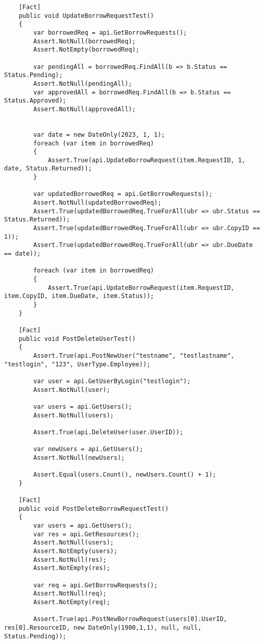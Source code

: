 \begin{verbatim}
    [Fact]
    public void UpdateBorrowRequestTest()
    {
        var borrowedReq = api.GetBorrowRequests();
        Assert.NotNull(borrowedReq);
        Assert.NotEmpty(borrowedReq);

        var pendingAll = borrowedReq.FindAll(b => b.Status == Status.Pending);
        Assert.NotNull(pendingAll);
        var approvedAll = borrowedReq.FindAll(b => b.Status == Status.Approved);
        Assert.NotNull(approvedAll);


        var date = new DateOnly(2023, 1, 1);
        foreach (var item in borrowedReq)
        {
            Assert.True(api.UpdateBorrowRequest(item.RequestID, 1, date, Status.Returned));
        }

        var updatedBorrowedReq = api.GetBorrowRequests();
        Assert.NotNull(updatedBorrowedReq);
        Assert.True(updatedBorrowedReq.TrueForAll(ubr => ubr.Status == Status.Returned));
        Assert.True(updatedBorrowedReq.TrueForAll(ubr => ubr.CopyID == 1));
        Assert.True(updatedBorrowedReq.TrueForAll(ubr => ubr.DueDate == date));

        foreach (var item in borrowedReq)
        {
            Assert.True(api.UpdateBorrowRequest(item.RequestID, item.CopyID, item.DueDate, item.Status));
        }
    }

    [Fact]
    public void PostDeleteUserTest()
    {
        Assert.True(api.PostNewUser("testname", "testlastname", "testlogin", "123", UserType.Employee));

        var user = api.GetUserByLogin("testlogin");
        Assert.NotNull(user);

        var users = api.GetUsers();
        Assert.NotNull(users);

        Assert.True(api.DeleteUser(user.UserID));

        var newUsers = api.GetUsers();
        Assert.NotNull(newUsers);

        Assert.Equal(users.Count(), newUsers.Count() + 1);
    }

    [Fact]
    public void PostDeleteBorrowRequestTest()
    {
        var users = api.GetUsers();
        var res = api.GetResources();
        Assert.NotNull(users);
        Assert.NotEmpty(users);
        Assert.NotNull(res);
        Assert.NotEmpty(res);

        var req = api.GetBorrowRequests();
        Assert.NotNull(req);
        Assert.NotEmpty(req);

        Assert.True(api.PostNewBorrowRequest(users[0].UserID, res[0].ResourceID, new DateOnly(1900,1,1), null, null, Status.Pending));


\end{verbatim}
